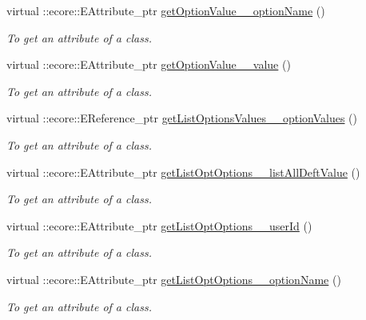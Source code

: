 \begin{DoxyCompactItemize}
virtual ::ecore::EAttribute\_\-ptr \hyperlink{classUMS__Data_1_1UMS__DataPackage_a660e243140b7b6817ed0eaa11369f317}{getOptionValue\_\-\_\-optionName} ()
\begin{DoxyCompactList}\small\item\em To get an attribute of a class. \item\end{DoxyCompactList}\item 
virtual ::ecore::EAttribute\_\-ptr \hyperlink{classUMS__Data_1_1UMS__DataPackage_afaa2ff47293ad0ce9e3b52ecbbd53aa8}{getOptionValue\_\-\_\-value} ()
\begin{DoxyCompactList}\small\item\em To get an attribute of a class. \item\end{DoxyCompactList}\item 
virtual ::ecore::EReference\_\-ptr \hyperlink{classUMS__Data_1_1UMS__DataPackage_a873e441151a7d6c3fe4f63874cd91c50}{getListOptionsValues\_\-\_\-optionValues} ()
\begin{DoxyCompactList}\small\item\em To get an attribute of a class. \item\end{DoxyCompactList}\item 
virtual ::ecore::EAttribute\_\-ptr \hyperlink{classUMS__Data_1_1UMS__DataPackage_a4645d3161dc53368c9e0b81562acb5cf}{getListOptOptions\_\-\_\-listAllDeftValue} ()
\begin{DoxyCompactList}\small\item\em To get an attribute of a class. \item\end{DoxyCompactList}\item 
virtual ::ecore::EAttribute\_\-ptr \hyperlink{classUMS__Data_1_1UMS__DataPackage_a988cb9759fbcc3270fa6bc87fd67570d}{getListOptOptions\_\-\_\-userId} ()
\begin{DoxyCompactList}\small\item\em To get an attribute of a class. \item\end{DoxyCompactList}\item 
virtual ::ecore::EAttribute\_\-ptr \hyperlink{classUMS__Data_1_1UMS__DataPackage_a57a0e510606fa07e7629279ef187a302}{getListOptOptions\_\-\_\-optionName} ()
\begin{DoxyCompactList}\small\item\em To get an attribute of a class. \item\end{DoxyCompactList}\end{DoxyCompactItemize}
